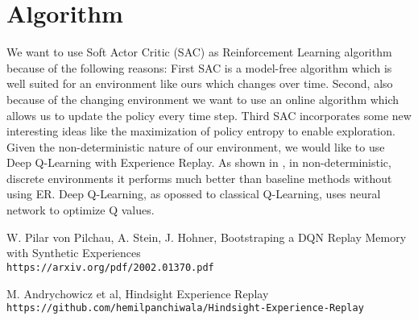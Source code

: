 \documentclass[11pt]{article} %
\begin{document}
\section{Algorithm}
We want to use Soft Actor Critic (SAC) as Reinforcement Learning algorithm because of the following reasons: First SAC is a model-free algorithm which is well suited for an environment like ours which changes over time. Second, also because of the changing environment we want to use an online algorithm which allows us to update the policy every time step. Third SAC incorporates some new interesting ideas like the maximization of policy entropy to enable exploration.
Given the non-deterministic nature of our environment, we would like to use Deep Q-Learning with Experience Replay. As shown in \cite{pilchau}, in non-deterministic, discrete environments it performs much better than baseline methods without using ER. Deep Q-Learning, as opossed to classical Q-Learning, uses neural network to optimize Q values.

\begin{thebibliography}{2}
W. Pilar von Pilchau, A. Stein, J. Hohner, Bootstraping a DQN Replay Memory with Synthetic Experiences\\
\texttt{https://arxiv.org/pdf/2002.01370.pdf}

M. Andrychowicz et al, Hindsight Experience Replay\\
\texttt{https://github.com/hemilpanchiwala/Hindsight-Experience-Replay}
\end{thebibliography}
\end{document}
